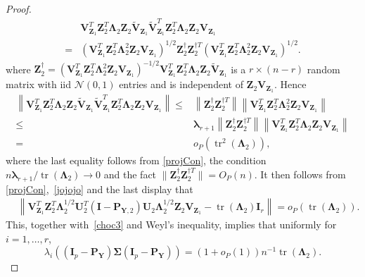 \documentclass[12pt]{article} %
\DeclareMathOperator{\mytr}{tr}
\newcommand{\bZ}{\mathbf{Z}}
\newcommand{\bP}{\mathbf{P}}
\newcommand{\bY}{\mathbf{Y}}
\newcommand{\bI}{\mathbf{I}}
\newcommand{\bU}{\mathbf{U}}
\newcommand{\bV}{\mathbf{V}}
\newcommand{\bfsym}[1]{\ensuremath{\boldsymbol{#1}}}
\def\blambda {\bfsym {\lambda}}
\def\bLambda {\bfsym {\Lambda}}
\def\bSigma {\bfsym {\Sigma}}
\theoremstyle{definition}
\begin{document}
\begin{appendices}
\begin{proof}
\begin{equation*}
    \begin{split}
            &\bV_{\bZ_1}^T \bZ_2^T \bLambda_2\bZ_{2} \tilde{\bV}_{\bZ_1}
            \tilde{\bV}_{\bZ_1}^T \bZ_2^T \bLambda_2 \bZ_2 \bV_{\bZ_1}
            \\
            =&
            (\bV_{\bZ_1}^T \bZ_2^T \bLambda_2^2 \bZ_2 \bV_{\bZ_1})^{1/2}
            \bZ_2^{\dagger}
            \bZ_2^{\dagger T}
            (\bV_{\bZ_1}^T \bZ_2^T \bLambda_2^2 \bZ_2 \bV_{\bZ_1})^{1/2}.
    \end{split}
\end{equation*}
where $
\bZ_2^{\dagger}=
            (\bV_{\bZ_1}^T \bZ_2^T \bLambda_2^2 \bZ_2 \bV_{\bZ_1})^{-1/2}
            \bV_{\bZ_1}^T \bZ_2^T \bLambda_2 \bZ_{2} \tilde{\bV}_{\bZ_1}
    $
    is a $r\times (n-r)$ random matrix with iid $\mathcal{N}(0,1)$ entries and is independent of $\bZ_2 \bV_{\bZ_1}$.
            Hence
\begin{equation*}
    \begin{split}
            \left\|
            \bV_{\bZ_1}^T \bZ_2^T \bLambda_2\bZ_{2} \tilde{\bV}_{\bZ_1}
            \tilde{\bV}_{\bZ_1}^T \bZ_2^T \bLambda_2 \bZ_2 \bV_{\bZ_1}
            \right\|
            \leq&
            \left\|
                \bZ_2^{\dagger}\bZ_2^{\dagger T}
            \right\|
            \left\|\bV_{\bZ_1}^T \bZ_2^T \bLambda_2^2 \bZ_2 \bV_{\bZ_1}\right\|
            \\
            \leq&
            \blambda_{r+1}
            \left\|
                \bZ_2^{\dagger}\bZ_2^{\dagger T}
            \right\|
            \left\|\bV_{\bZ_1}^T \bZ_2^T \bLambda_2 \bZ_2 \bV_{\bZ_1}\right\|
            \\
            =&o_P\left(\mytr^2(\bLambda_2)\right),
    \end{split}
\end{equation*}
where the last equality follows from \eqref{projCon}, the condition $n\blambda_{r+1}/\mytr(\bLambda_2)\to 0$ and the fact 
            $
            \|
                \bZ_2^{\dagger}\bZ_2^{\dagger T}
            \|
            =O_P(n)$.
            It then follows from \eqref{projCon},~\eqref{jojojo} and the last display that
\begin{equation*}
    \begin{split}
                  &\left\|
                  \bV_{\bZ_1}^T \bZ_2^T \bLambda_2^{1/2} \bU_2^T (\bI-\bP_{\bY,2}) \bU_2 \bLambda_2^{1/2} \bZ_2 \bV_{\bZ_1}
                  -
                      \mytr(\bLambda_2) \bI_r
                  \right\|
                  = o_P\left(\mytr(\bLambda_2)\right).
    \end{split}
\end{equation*}
This, together with~\eqref{choc3} and Weyl's inequality, implies that uniformly for $i=1,\ldots, r$,
\begin{equation*}
    \lambda_i\left(
             (\bI_p -\bP_\bY)\bSigma (\bI_p- \bP_{\bY})
         \right)
         =(1+o_P(1))n^{-1}\mytr(\bLambda_2).
\end{equation*}



\end{proof}
\end{appendices}
\end{document}
